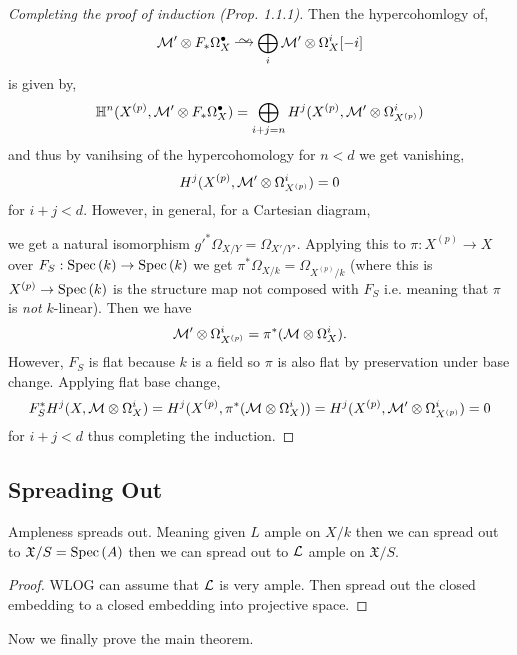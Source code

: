 \documentclass[12pt]{article}
\begin{document}
\begin{proof}[Completing the proof of induction (Prop. 1.1.1)]
Then the hypercohomlogy of,
\[ \M' \ot F_* \Omega^\bullet_X \iso \bigoplus_{i} \M' \otimes \Omega^i_X [-i] \]
is given by,
\[ \mathbb{H}^n(X^{(p)}, \mathcal{M}' \otimes F_* \Omega_X^\bullet) = \bigoplus_{i + j = n} H^j(X^{(p)}, \mathcal{M}' \otimes \Omega^i_{X^{(p)}}) \]
and thus by vanihsing of the hypercohomology for $n < d$ we get vanishing,
\[ H^j(X^{(p)}, \mathcal{M}' \otimes \Omega^i_{X^{(p)}}) = 0 \]
for $i + j < d$. However, in general, for a Cartesian diagram,
\begin{center}
\end{center}
we get a natural isomorphism $g'^* \Omega_{X/Y} = \Omega_{X'/Y'}$. Applying this to $\pi : X^{(p)} \to X$ over $F_S : \mathrm{Spec}\left( k \right) \to \mathrm{Spec}\left( k \right)$ we get $\pi^* \Omega_{X/k} = \Omega_{X^{(p)}/k}$ (where this is $X^{(p)} \to \mathrm{Spec}\left( k \right)$ is the structure map not composed with $F_S$ i.e. meaning that $\pi$ is \textit{not} $k$-linear). Then we have 
\[ \mathcal{M}' \otimes \Omega^i_{X^{(p)}} = \pi^* (\mathcal{M} \otimes \Omega^i_X). \]
However, $F_S$ is flat because $k$ is a field so $\pi$ is also flat by preservation under base change. Applying flat base change,
\[ F_S^* H^j(X, \mathcal{M} \otimes \Omega^i_X) = H^j(X^{(p)}, \pi^*(\mathcal{M} \otimes \Omega^i_X)) = H^j(X^{(p)}, \mathcal{M}' \otimes \Omega^i_{X^{(p)}}) = 0 \]
for $i + j < d$ thus completing the induction.
\end{proof}


\subsection{Spreading Out}

\renewcommand{\X}{\mathfrak{X}}

\begin{prop}
Ampleness spreads out. Meaning given $L$ ample on $X / k$ then we can spread out to $\X / S = \Spec{A}$ then we can spread out to $\mathcal{L}$ ample on $\X / S$. 
\end{prop}

\begin{proof}
WLOG can assume that $\mathcal{L}$ is very ample. Then spread out the closed embedding to a closed embedding into projective space.
\end{proof}

\begin{rmk}
Now we finally prove the main theorem.
\end{rmk}
\end{document}
